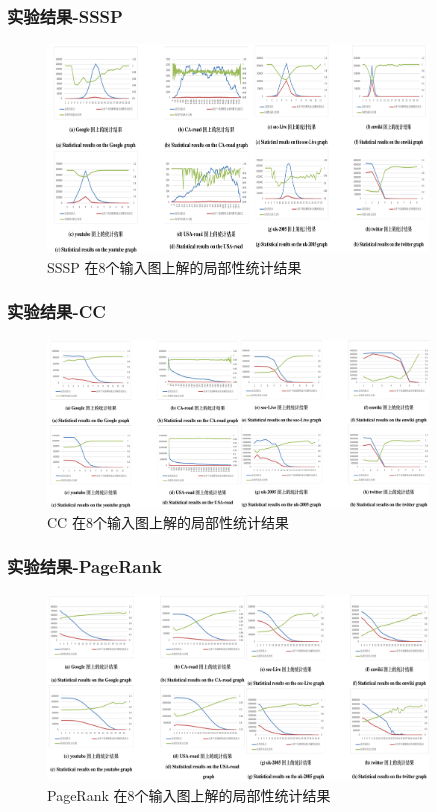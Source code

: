 \documentclass[10pt]{beamer}
\begin{document}
\begin{frame}%
  \frametitle{实验结果-SSSP}

  \begin{figure}[H]
    \centering
    \includegraphics[width=0.9\textwidth]{Img/ppt_percent.png}
    \caption[]{SSSP 在8个输入图上解的局部性统计结果}
  \end{figure}
\end{frame}


\begin{frame}%
  \frametitle{实验结果-CC}

  \begin{figure}[H]
    \centering
    \includegraphics[width=0.9\textwidth]{Img/ppt_percent_cc.png}
    \caption[]{CC 在8个输入图上解的局部性统计结果}
  \end{figure}
\end{frame}


\begin{frame}%
  \frametitle{实验结果-PageRank}

  \begin{figure}[H]
    \centering
    \includegraphics[width=0.9\textwidth]{Img/ppt_percent_pg.png}
    \caption[]{PageRank 在8个输入图上解的局部性统计结果}
  \end{figure}
\end{frame}
\end{document}
